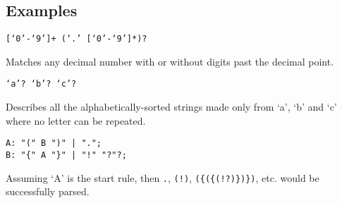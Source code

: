 
\subsection{Examples}
{
	\begin{itemize}
	{
		\item[] \texttt{[`0'-`9']+ (`.' [`0'-`9']*)?}
		
			Matches any decimal number with or without digits
			past the decimal point.
		
		\item[] \texttt{`a'? `b'? `c'?}
		
			Describes all the alphabetically-sorted strings made only
			from `a', `b' and `c' where no letter can be repeated.
		
		\item[]
\begin{lstlisting}[texcl = true, language = MAIA]
A: "(" B ")" | ".";
B: "{" A "}" | "!" "?"?;
\end{lstlisting}
			Assuming `A' is the start rule, then \texttt{.},
			\texttt{(!)}, \texttt{(\{(\{(!?)\})\})}, etc.
			would be successfully parsed.
	}
	\end{itemize}
}

